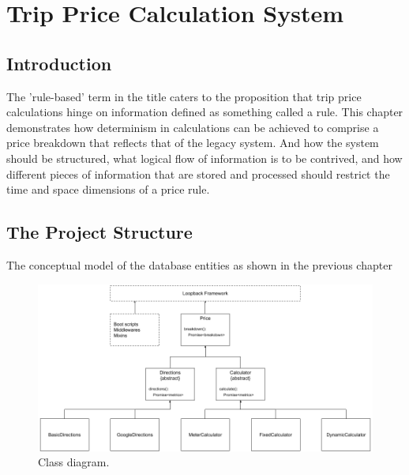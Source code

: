 \graphicspath{{Chapter4/Figs/Vector/}{Chapter4/Figs/}}

\chapter{Trip Price Calculation System}
\section{Introduction}
The 'rule-based' term in the title caters to the proposition that trip price calculations hinge on information defined as something called a rule. This chapter demonstrates how determinism in calculations can be achieved to comprise a price breakdown that reflects that of the legacy system. And how the system should be structured, what logical flow of information is to be contrived, and how different pieces of information that are stored and processed should restrict the time and space dimensions of a price rule.

\section{The Project Structure}
The conceptual model of the database entities as shown in the previous chapter

\begin{figure}[H]
	\centering
	\includegraphics[width=1\textwidth]{ClassDiagram}
	\caption[Class Diagram]{Class diagram.}
	\label{fig:ClassDiagram}
\end{figure}

